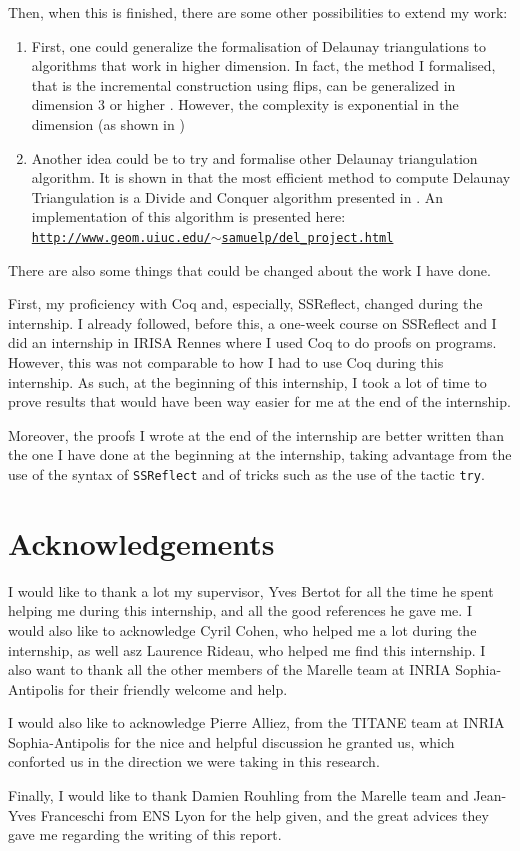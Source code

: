 \documentclass[a4paper,10pt]{article}
\begin{document}
Then, when this is finished, there are some other possibilities to extend my work:
\begin{enumerate}
\item First, one could generalize the formalisation of Delaunay triangulations to algorithms that work in higher dimension. In fact, the method I formalised, that is the incremental construction using flips, can be generalized in dimension 3 or higher \cite{CompGeoAlgo}. However, the complexity is exponential in the dimension (as shown in \cite{IncrementalDimension})
\item Another idea could be to try and formalise other Delaunay triangulation algorithm. It is shown in \cite{Comparison} that the most efficient method to compute Delaunay Triangulation is a Divide and Conquer algorithm presented in \cite{AlgoDivide}. An implementation of this algorithm is presented here:\\
  \href{http://www.geom.uiuc.edu/~samuelp/del_project.html}{{\tt http://www.geom.uiuc.edu/$\sim$samuelp/del\_project.html}}
\end{enumerate}

There are also some things that could be changed about the work I have done.

First, my proficiency with {\sc Coq} and, especially, {\sc SSReflect}, changed during the internship. I already followed, before this, a one-week course on {\sc SSReflect} and I did an internship in IRISA Rennes where I used {\sc Coq} to do proofs on programs. However, this was not comparable to how I had to use {\sc Coq} during this internship. As such, at the beginning of this internship, I took a lot of time to prove results that would have been way easier for me at the end of the internship.

  Moreover, the proofs I wrote at the end of the internship are better written than the one I have done at the beginning at the internship, taking advantage from the use of the syntax of {\tt SSReflect} and of tricks such as the use of the tactic {\tt try}.

\section{Acknowledgements}
I would like to thank a lot my supervisor, Yves Bertot for all the time he spent helping me during this internship, and all the good references he gave me. I would also like to acknowledge Cyril Cohen, who helped me a lot during the internship, as well asz Laurence Rideau, who helped me find this internship. I also want to thank all the other members of the Marelle team at INRIA Sophia-Antipolis for their friendly welcome and help.

I would also like to acknowledge Pierre Alliez, from the TITANE team at INRIA Sophia-Antipolis for the nice and helpful discussion he granted us, which conforted us in the direction we were taking in this research.

Finally, I would like to thank Damien Rouhling from the Marelle team and Jean-Yves Franceschi from ENS Lyon for the help given, and the great advices they gave me regarding the writing of this report.

\newpage


\end{document}
